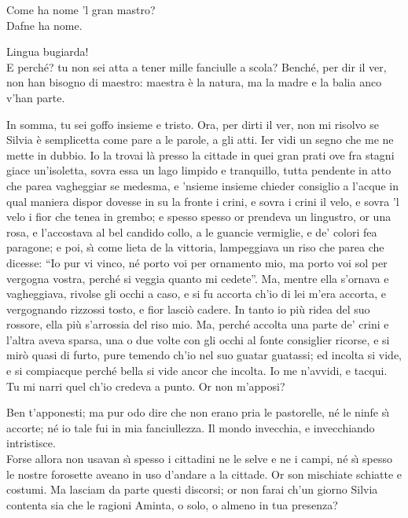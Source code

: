\documentclass{book}
\begin{document}
	\2 Come ha nome 'l gran mastro? \\

   \5 Dafne ha nome.

	\2 Lingua bugiarda! \\

   \5 E perch\'e? tu non sei
	atta a tener mille fanciulle a scola?
	Bench\'e, per dir il ver, non han bisogno
	di maestro: maestra \`e la natura,
	ma la madre e la balia anco v'han parte.

	\2 In somma, tu sei goffo insieme e tristo.
	Ora, per dirti il ver, non mi risolvo
	se Silvia \`e semplicetta come pare
	a le parole, a gli atti. Ier vidi un segno
	che me ne mette in dubbio. Io la trovai
	l\`a presso la cittade in quei gran prati
	ove fra stagni giace un'isoletta,
	sovra essa un lago limpido e tranquillo,
	tutta pendente in atto che parea
	vagheggiar se medesma, e 'nsieme insieme
	chieder consiglio a l'acque in qual maniera
	dispor dovesse in su la fronte i crini,
	e sovra i crini il velo, e sovra 'l velo
	i fior che tenea in grembo; e spesso spesso
	or prendeva un lingustro, or una rosa,
	e l'accostava al bel candido collo,
	a le guancie vermiglie, e de' colori
	fea paragone; e poi, s\`{\i} come lieta
	de la vittoria, lampeggiava un riso
	che parea che dicesse: ``Io pur vi vinco,
	n\'e porto voi per ornamento mio,
	ma porto voi sol per vergogna vostra,
	perch\'e si veggia quanto mi cedete''.
	Ma, mentre ella s'ornava e vagheggiava,
	rivolse gli occhi a caso, e si fu accorta
	ch'io di lei m'era accorta, e vergognando
	rizzossi tosto, e fior lasci\`o cadere.
	In tanto io pi\`u ridea del suo rossore,
	ella pi\`u s'arrossia del riso mio.
	Ma, perch\'e accolta una parte de' crini
	e l'altra aveva sparsa, una o due volte
	con gli occhi al fonte consiglier ricorse,
	e si mir\`o quasi di furto, pure
	temendo ch'io nel suo guatar guatassi;
	ed incolta si vide, e si compiacque
	perch\'e bella si vide ancor che incolta.
	Io me n'avvidi, e tacqui. \\

   \5 Tu mi narri
	quel ch'io credeva a punto. Or non m'apposi?

	\2 Ben t'apponesti; ma pur odo dire
	che non erano pria le pastorelle,
	n\'e le ninfe s\`{\i} accorte; n\'e io tale
	fui in mia fanciullezza. Il mondo invecchia,
	e invecchiando intristisce. \\

   \5 Forse allora
	non usavan s\`{\i} spesso i cittadini
	ne le selve e ne i campi, n\'e s\`{\i} spesso
	le nostre forosette aveano in uso
	d'andare a la cittade. Or son mischiate
	schiatte e costumi. Ma lasciam da parte
	questi discorsi; or non farai ch'un giorno
	Silvia contenta sia che le ragioni
	Aminta, o solo, o almeno in tua presenza?
\end{document}
